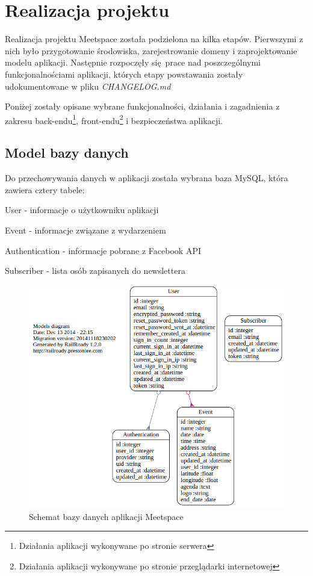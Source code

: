 \section{Realizacja projektu}
Realizacja projektu Meetspace została podzielona na kilka etapów. Pierwszymi z nich było przygotowanie środowiska, zarejestrowanie domeny i zaprojektowanie modelu aplikacji. Następnie rozpoczęły się prace nad poszczególnymi funkcjonalnościami aplikacji, których etapy powstawania zostały udokumentowane w pliku \emph{CHANGELOG.md}

Poniżej zostały opisane wybrane funkcjonalności, działania i zagadnienia z zakresu back-endu\footnote{Działania aplikacji wykonywane po stronie serwera}, front-endu\footnote{Działania aplikacji wykonywane po stronie przeglądarki internetowej} i bezpieczeństwa aplikacji.
  \clearpage
  \subsection{Model bazy danych}
    Do przechowywania danych w aplikacji została wybrana baza MySQL, która zawiera cztery tabele:
    \begin{itemizeReduced}
      \item User - informacje o użytkowniku aplikacji
      \item Event - informacje związane z wydarzeniem
      \item Authentication - informacje pobrane z Facebook API
      \item Subscriber - lista osób zapisanych do newslettera
    \end{itemizeReduced}

    \begin{figure}[h]
      \centering
        \includegraphics[scale=0.55]{images/dbm.png}
      \caption{Schemat bazy danych aplikacji Meetspace}
    \end{figure}

